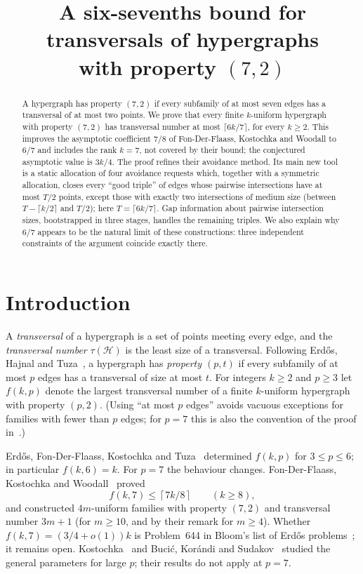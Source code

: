 \documentclass[11pt]{article}
\title{A six-sevenths bound for transversals of hypergraphs\\ with property $(7,2)$}
\author{}
\date{}
\numberwithin{equation}{section}
\theoremstyle{definition}
\theoremstyle{remark}
\newcommand{\HH}{\mathcal H}
\newcommand{\ceil}[1]{\left\lceil #1\right\rceil}
\begin{document}
\maketitle

\begin{abstract}
A hypergraph has property $(7,2)$ if every subfamily of at most seven
edges has a transversal of at most two points. We prove that every
finite $k$-uniform hypergraph with property $(7,2)$ has transversal
number at most $\lceil 6k/7\rceil$, for every $k\ge2$. This improves the
asymptotic coefficient $7/8$ of Fon-Der-Flaass, Kostochka and Woodall
to $6/7$ and includes the rank $k=7$, not covered by their bound; the
conjectured asymptotic value is $3k/4$. The proof refines their
avoidance method. Its main new tool is a static allocation of four
avoidance requests which, together with a symmetric allocation, closes
every ``good triple'' of edges whose pairwise intersections have at most
$T/2$ points, except those with exactly two intersections of medium
size (between $T-\lceil k/2\rceil$ and $T/2$); here $T=\lceil6k/7\rceil$. Gap information about pairwise
intersection sizes, bootstrapped in three stages, handles the remaining
triples. We also explain why $6/7$ appears to be the natural
limit of these constructions: three independent constraints of the
argument coincide exactly there.
\end{abstract}

\section{Introduction}\label{sec:intro}

A \emph{transversal} of a hypergraph is a set of points meeting every
edge, and the \emph{transversal number} $\tau(\HH)$ is the least size
of a transversal. Following Erd\H{o}s, Hajnal and Tuza~\cite{EHT}, a
hypergraph has \emph{property $(p,t)$} if every subfamily of at most $p$
edges has a transversal of size at most $t$. For integers $k\ge2$ and
$p\ge3$ let $f(k,p)$ denote the largest transversal number of a finite
$k$-uniform hypergraph with property $(p,2)$. (Using ``at most $p$
edges'' avoids vacuous exceptions for families with fewer than $p$
edges; for $p=7$ this is also the convention of the proof
in~\cite{FKW}.)

Erd\H{o}s, Fon-Der-Flaass, Kostochka and Tuza~\cite{EFKT} determined
$f(k,p)$ for $3\le p\le6$; in particular $f(k,6)=k$. For $p=7$ the
behaviour changes. Fon-Der-Flaass, Kostochka and Woodall~\cite{FKW}
proved
\[
 f(k,7)\le\ceil{7k/8}\qquad(k\ge8),
\]
and constructed $4m$-uniform families with property $(7,2)$ and
transversal number $3m+1$ (for $m\ge10$, and by their remark for $m\ge4$).
Whether $f(k,7)=(3/4+o(1))k$ is Problem~644 in Bloom's list of Erd\H{o}s
problems~\cite{Bloom}; it remains open. Kostochka~\cite{Kostochka} and
Buci\'c, Kor\'andi and Sudakov~\cite{BKS} studied the general parameters
for large $p$; their results do not apply at $p=7$.
\end{document}
